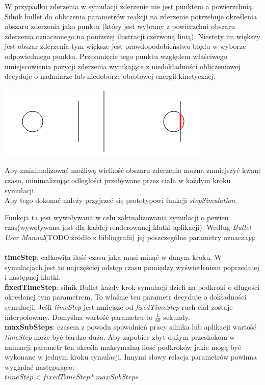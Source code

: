 W przypadku zderzenia w symulacji zderzenie nie jest punktem a powierzchnią.
Silnik bullet do obliczenia parametrów reakcji na zderzenie potrzebuje
określenia obszaru zderzenia jako punktu (który jest wybrany z powierzchni
obszaru zderzenia oznaczonego na poniższej ilustracji czerwoną linią). Niestety
im większy jest obszar zderzenia tym większe jest prawdopodobieństwo błędu w
wyborze odpowiedniego punktu. Przesunięcie tego punktu względem właściwego
umiejscowienia pozycji zderzenia wynikające z niedokładności obliczeniowej
decyduje o nadmiarze lub niedoborze obrotowej energii kinetycznej.

\begin{center}
\includegraphics{./img/zderzenie2.png}
\end{center}

Aby zminimalizować możliwą wielkość obszaru zderzenia można zmniejszyć kwant
czasu, minimalizując odległości przebywane przez ciała w każdym kroku
symulacji.\\
Aby tego dokonać należy przyjrzeć się prototypowi funkcji \emph{stepSimulation}.



Funkcja ta jest wywoływana w celu zaktualizowania symulacji o pewien
czas(wywoływana jest dla każdej renderowanej klatki aplikacji). Według
\emph{Bullet User Manual}(TODO:źródło z bibliografii) jej poszczególne parametry
oznaczają:\\
\\
\textbf{timeStep}: całkowita ilość czasu jaka musi minąć w danym kroku. W
symulacjach jest to najczęściej odstęp czasu pomiędzy wyświetleniem poprzedniej
i następnej klatki.\\
\textbf{fixedTimeStep}: silnik Bullet każdy krok symulacji dzieli na podkroki o
długości okreslanej tym parametrem. To właśnie ten parametr decyduje o
dokładności symulacji. Jeśli \emph{timeStep} jest mniejsze od
\emph{fixedTimeStep} ruch ciał zostaje interpolowany. Domyślna wartość parametru
to $ \frac{1}{60} $ sekundy.\\
\textbf{maxSubSteps}: czasem z powodu spowolnień pracy silnika lub aplikacji
wartość \emph{timeStep} może być bardzo duża. Aby zapobiec zbyt dużym przeskokom
w animacji parametr ten określa maksymalną ilość podkroków jakie mogą być
wykonane w jednym kroku symulacji. Innymi słowy relacja parametrów powinna
wyglądać następująco:\\
$ timeStep < fixedTimeStep * maxSubSteps $


